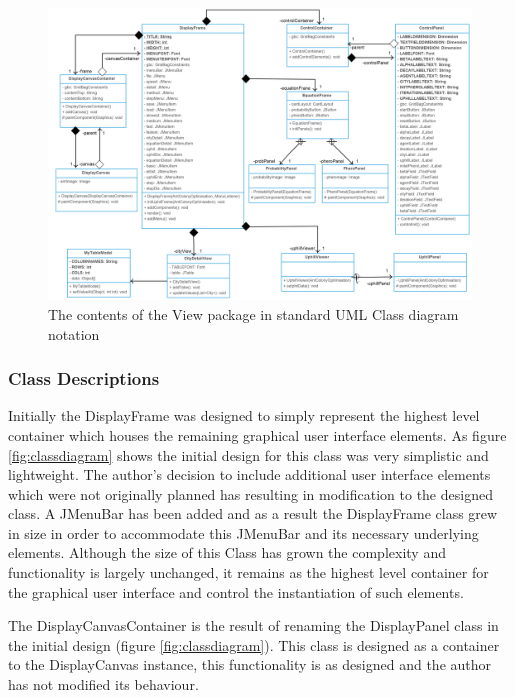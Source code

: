 \clearpage
\begin{figure}
\includegraphics[scale=0.225]{Images/chapter4/view}
\caption[View Package Class Diagram]{The contents of the View package in standard UML Class diagram notation}
\label{fig:classdiagramImp}
\end{figure}
\clearpage

\subsubsection{Class Descriptions}
\label{view:clss}
Initially the DisplayFrame was designed to simply represent the highest level container which houses the remaining graphical user interface elements. As figure \ref{fig:classdiagram} shows the initial design for this class was very simplistic and lightweight. The author's decision to include additional user interface elements which were not originally planned has resulting in modification to the designed class. A JMenuBar has been added and as a result the DisplayFrame class grew in size in order to accommodate this JMenuBar and its necessary underlying elements. Although the size of this Class has grown the complexity and functionality is largely unchanged, it remains as the highest level container for the graphical user interface and control the instantiation of such elements.

The DisplayCanvasContainer is the result of renaming the DisplayPanel class in the initial design (figure \ref{fig:classdiagram}). This class is designed as a container to the DisplayCanvas instance, this functionality is as designed and the author has not modified its behaviour.

